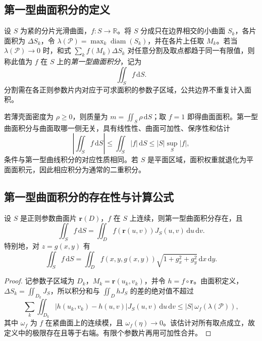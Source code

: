 \subsection{第一型曲面积分的定义}
\label{subsec:definition-of-surface-integrals-of-the-first-kind}

\begin{definition}
\label{def:surface-integral-first-kind}
设 $S$ 为紧的分片光滑曲面，$f:S\to\mathbb R$。将 $S$ 分成只在边界相交的小曲面 $S_k$，各片面积为 $\Delta S_k$，令 $\lambda(\mathcal P)=\max_k\operatorname{diam}(S_k)$，并在各片上任取 $M_k$。若当 $\lambda(\mathcal P)\to0$ 时，和式 $\sum_k f(M_k)\Delta S_k$ 对任意分割及取点都趋于同一有限值，则称此值为 $f$ 在 $S$ 上的\emph{第一型曲面积分}，记为
\[
    \iint_S f\,\mathrm dS.
\]
分割需在各正则参数片内对应于可求面积的参数子区域，公共边界不重复计入面积。
\end{definition}

若薄壳面密度为 $\rho\geq0$，则质量为 $m=\iint_S\rho\,\mathrm dS$；取 $f=1$ 即得曲面面积。第一型曲面积分与曲面取哪一侧无关，具有线性性、曲面可加性、保序性和估计
\[
    \left|\iint_S f\,\mathrm dS\right|
    \leq\iint_S|f|\,\mathrm dS
    \leq |S|\sup_S|f|,
\]
条件与第一型曲线积分的对应性质相同。若 $S$ 是平面区域，面积权重就退化为平面面积元，因此相应积分为通常的二重积分。

\subsection{第一型曲面积分的存在性与计算公式}
\label{subsec:existence-and-evaluation-of-surface-integrals-of-the-first-kind}

\begin{theorem}
\label{thm:first-surface-integral-parametric}
设 $S$ 是正则参数曲面片 $\boldsymbol r(D)$，$f$ 在 $S$ 上连续，则第一型曲面积分存在，且
\begin{equation}
\label{eq:first-surface-integral-parametric}
    \iint_S f\,\mathrm dS
    =\iint_D f(\boldsymbol r(u,v))J_S(u,v)\,\mathrm du\,\mathrm dv.
\end{equation}
特别地，对 $z=g(x,y)$ 有
\[
    \iint_S f\,\mathrm dS
    =\iint_D f(x,y,g(x,y))\sqrt{1+g_x^2+g_y^2}\,\mathrm dx\,\mathrm dy.
\]
\end{theorem}

\begin{proof}
记参数子区域为 $D_k$，$M_k=\boldsymbol r(u_k,v_k)$，并令 $h=f\circ\boldsymbol r$。由面积定义，$\Delta S_k=\iint_{D_k}J_S$，所以积分和与 $\iint_DhJ_S$ 的差的绝对值不超过
\[
    \sum_k\iint_{D_k}
    |h(u_k,v_k)-h(u,v)|J_S(u,v)\,\mathrm du\,\mathrm dv
    \leq |S|\,\omega_f(\lambda(\mathcal P)),
\]
其中 $\omega_f$ 为 $f$ 在紧曲面上的连续模，且 $\omega_f(\eta)\to0$。该估计对所有取点成立，故定义中的极限存在且等于右端。有限个参数片再用可加性合并。
\end{proof}

